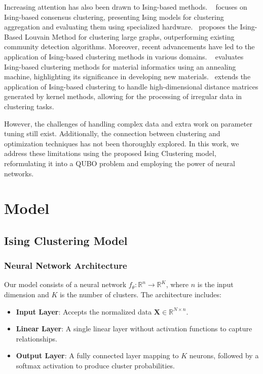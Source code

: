 \documentclass[journal]{IEEEtran}
\begin{document}
Increasing attention has also been drawn to Ising-based methods. ~\cite{cohen2020ising} focuses on Ising-based consensus clustering, presenting Ising models for clustering aggregation and evaluating them using specialized hardware.~\cite{kalehbasti2021ising} proposes the Ising-Based Louvain Method for clustering large graphs, outperforming existing community detection algorithms. Moreover, recent advancements have led to the application of Ising-based clustering methods in various domains. ~\cite{komatsu2021externally} evaluates Ising-based clustering methods for material informatics using an annealing machine, highlighting its significance in developing new materials.~\cite{kumagai2023ising} extends the application of Ising-based clustering to handle high-dimensional distance matrices generated by kernel methods, allowing for the processing of irregular data in clustering tasks.

However, the challenges of handling complex data and extra work on parameter tuning still exist. Additionally, the connection between clustering and optimization techniques has not been thoroughly explored. In this work, we address these limitations using the proposed Ising Clustering model, reformulating it into a QUBO problem and employing the power of neural networks.


\section{Model}

\subsection{Ising Clustering Model}

\subsubsection{Neural Network Architecture}

Our model consists of a neural network \( f_{\theta}: \mathbb{R}^n \rightarrow \mathbb{R}^K \), where \( n \) is the input dimension and \( K \) is the number of clusters. The architecture includes:

\begin{itemize}
    \item \textbf{Input Layer}: Accepts the normalized data \( \mathbf{X} \in \mathbb{R}^{N \times n} \).
    \item \textbf{Linear Layer}: A single linear layer without activation functions to capture relationships.
    \item \textbf{Output Layer}: A fully connected layer mapping to \( K \) neurons, followed by a softmax activation to produce cluster probabilities.
\end{itemize}
\end{document}
